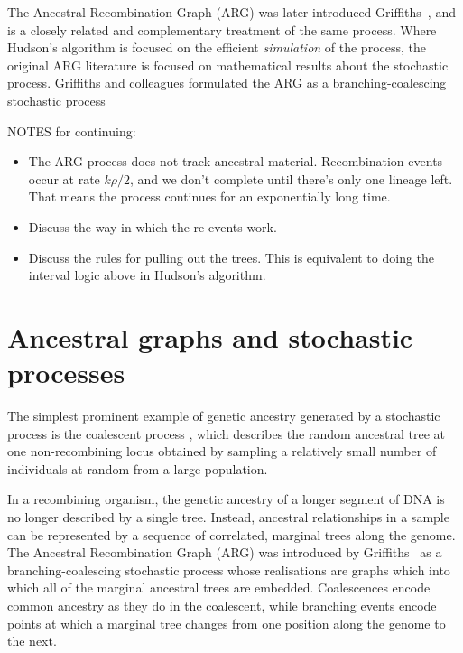 \documentclass{article}
\begin{document}
The Ancestral Recombination Graph (ARG) was later introduced
Griffiths~\citep{griffiths1991two,ethier1990two,griffiths1997ancestral}, and is a
closely related and complementary treatment of the same process. Where
Hudson's algorithm is focused on the efficient \emph{simulation} of the
process, the original ARG literature is focused on mathematical
results about the stochastic process. Griffiths and colleagues formulated the
ARG as a branching-coalescing stochastic process

NOTES for continuing:

\begin{itemize}
\item The ARG process does not track ancestral material. Recombination events
occur at rate $k \rho / 2$, and we don't complete until there's only one
lineage left. That means the process continues for an exponentially long time.
\item Discuss the way in which the re events work.
\item Discuss the rules for pulling out the trees. This is equivalent to doing
the interval logic above in Hudson's algorithm.
\end{itemize}

\section*{Ancestral graphs and stochastic processes}


The simplest prominent example of genetic ancestry generated by a stochastic process
is the coalescent process \citep{kingman1982coalescent,kingman1982genealogy,
hudson1983testing, tajima1983evolutionary}, which describes the random
ancestral tree at one non-recombining locus obtained by sampling a relatively
small number of individuals at random from a large population.

In a recombining organism, the genetic ancestry of a longer segment of DNA is
no longer described by a single tree. Instead, ancestral relationships in a
sample can be represented by a sequence of correlated, marginal trees along the
genome. The Ancestral Recombination Graph (ARG) was introduced by
Griffiths~\citep{griffiths1991two,griffiths1997ancestral} as a branching-coalescing
stochastic process whose realisations are graphs which into which all of the
marginal ancestral trees are embedded. Coalescences encode common ancestry
as they do in the coalescent, while branching events encode points at which a
marginal tree changes from one position along the genome to the next.
\end{document}
